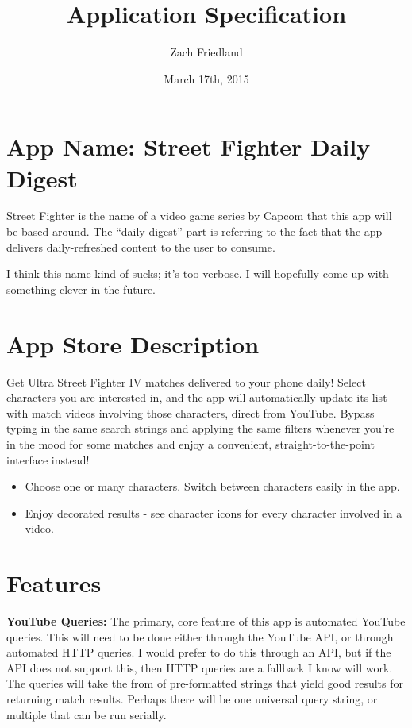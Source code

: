 \documentclass[10pt,letterpaper,final]{article}
\title{Application Specification}
\author{Zach Friedland}
\date{March 17th, 2015}
\begin{document}
\maketitle

\section*{App Name: Street Fighter Daily Digest}
Street Fighter is the name of a video game series by Capcom that this app will be based around. The ``daily digest'' part is referring to the fact that the app delivers daily-refreshed content to the user to consume.

I think this name kind of sucks; it's too verbose. I will hopefully come up with something clever in the future.

\section*{App Store Description}
Get Ultra Street Fighter IV matches delivered to your phone daily! Select characters you are interested in, and the app will automatically update its list with match videos involving those characters, direct from YouTube. Bypass typing in the same search strings and applying the same filters whenever you're in the mood for some matches and enjoy a convenient, straight-to-the-point interface instead!

\begin{itemize}
  \item Choose one or many characters. Switch between characters easily in the app.
  \item Enjoy decorated results - see character icons for every character involved in a video.
\end{itemize}

\section*{Features}
\textbf{YouTube Queries:} The primary, core feature of this app is automated YouTube queries. This will need to be done either through the YouTube API, or through automated HTTP queries. I would prefer to do this through an API, but if the API does not support this, then HTTP queries are a fallback I know will work. The queries will take the from of pre-formatted strings that yield good results for returning match results. Perhaps there will be one universal query string, or multiple that can be run serially.
\end{document}
